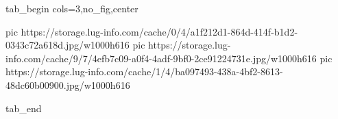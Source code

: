  
 
 
 
 


\ifcmt
  tab_begin cols=3,no_fig,center

     pic https://storage.lug-info.com/cache/0/4/a1f212d1-864d-414f-b1d2-0343c72a618d.jpg/w1000h616
		 pic https://storage.lug-info.com/cache/9/7/4efb7c09-a0f4-4adf-9bf0-2ce91224731e.jpg/w1000h616
		 pic https://storage.lug-info.com/cache/1/4/ba097493-438a-4bf2-8613-48dc60b00900.jpg/w1000h616

  tab_end
\fi
